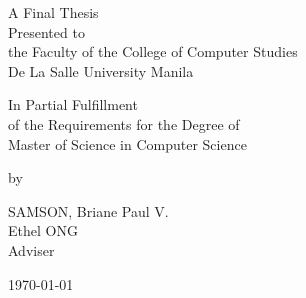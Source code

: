 %
%
%                 

\begin{titlepage}
\centering



\vspace{1.75cm}
A Final Thesis\\
Presented to\\
the Faculty of the College of Computer Studies\\
De La Salle University Manila

\vspace{1.75cm}
In Partial Fulfillment\\
of the Requirements for the Degree of\\

Master of Science in Computer Science

\vspace{1.75cm}
by\\
\vspace{1cm}

SAMSON, Briane Paul V.  \\

\vspace{1.75cm}
Ethel ONG \\
Adviser

\vspace{1.75cm}
\today
\end{titlepage}
